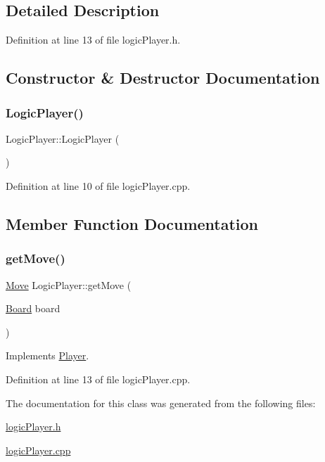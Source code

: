 \subsection{Detailed Description}


Definition at line 13 of file logic\+Player.\+h.



\subsection{Constructor \& Destructor Documentation}
\mbox{\label{class_logic_player_a9a046e3f4019b241611ba08bd9e3a2c2}} 
\subsubsection{\texorpdfstring{Logic\+Player()}{LogicPlayer()}}
{\footnotesize\ttfamily Logic\+Player\+::\+Logic\+Player (\begin{DoxyParamCaption}{ }\end{DoxyParamCaption})}



Definition at line 10 of file logic\+Player.\+cpp.



\subsection{Member Function Documentation}
\mbox{\label{class_logic_player_a43a34db899e75294d73c18477c139e6a}} 
\subsubsection{\texorpdfstring{get\+Move()}{getMove()}}
{\footnotesize\ttfamily \hyperlink{struct_move}{Move} Logic\+Player\+::get\+Move (\begin{DoxyParamCaption}\item[{\hyperlink{constants_8h_af901d0acc1572fb0c779f84ddd2c6ce8}{Board}}]{board }\end{DoxyParamCaption})\hspace{0.3cm}{\ttfamily [virtual]}}



Implements \hyperlink{class_player_a97a516ce71ccef14123884b562c90e4c}{Player}.



Definition at line 13 of file logic\+Player.\+cpp.



The documentation for this class was generated from the following files\+:\begin{DoxyCompactItemize}
\item 
\hyperlink{logic_player_8h}{logic\+Player.\+h}\item 
\hyperlink{logic_player_8cpp}{logic\+Player.\+cpp}\end{DoxyCompactItemize}
